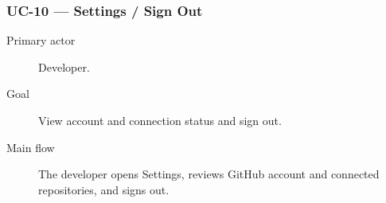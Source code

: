 \subsubsection{UC-10 --- Settings / Sign Out}
\begin{description}
  \item[Primary actor] Developer.
  \item[Goal] View account and connection status and sign out.
  \item[Main flow] The developer opens Settings, reviews GitHub account and
        connected repositories, and signs out.
\end{description}